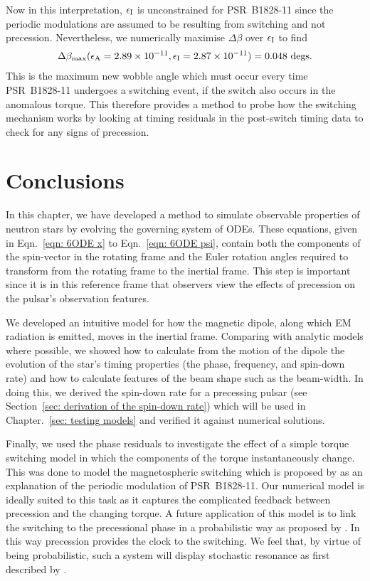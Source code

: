 \documentclass[../full_thesis/full_thesis.tex]{subfiles}
\begin{document}
Now in this interpretation, $\epsilon_{\mathrm{I}}$ is unconstrained for PSR~B1828-11 since the
periodic modulations are assumed to be resulting from switching and not
precession. Nevertheless, we numerically maximise $\Delta\beta$ over $\epsilon_{\mathrm{I}}$ to
find
\begin{align}
\Delta\beta_{\textrm{max}}(\epsilon_{\mathrm{A}}=2.89\times10^{-11}, \epsilon_{\mathrm{I}}=2.87\times10^{-11})
= 0.048 \textrm{ degs}.
\end{align}
This is the maximum new wobble angle which must occur every time PSR~B1828-11 undergoes a
switching event, if the switch also occurs in the anomalous torque. This
therefore provides a method to probe how the switching mechanism works by
looking at timing residuals in the post-switch timing data to check for
any signs of precession.

\section{Conclusions}
\label{sec: conclusion inertial}

In this chapter, we have developed a method to simulate observable properties
of neutron stars by evolving the governing system of ODEs. These equations,
given in Eqn.~\eqref{eqn: 6ODE x} to Eqn.~\eqref{eqn: 6ODE psi}, contain both
the components of the spin-vector in the rotating frame and the Euler rotation
angles required to transform from the rotating frame to the inertial frame.
This step is important since it is in this reference frame that observers view
the effects of precession on the pulsar's observation features.

We developed an intuitive model for how the magnetic dipole, along which EM
radiation is emitted, moves in the inertial frame. Comparing with analytic
models where possible, we showed how to calculate from the motion of the
dipole the evolution of the star's timing properties (the phase, frequency, and
spin-down rate) and how to calculate features of the beam shape such as the
beam-width. In doing this, we derived the spin-down rate for a precessing pulsar
(see Section~\ref{sec: derivation of the spin-down rate}) which will be used in
Chapter.~\ref{sec: testing models} and verified it against numerical solutions.

Finally, we used the phase residuals to investigate the effect of a simple torque
switching model in which the components of the torque instantaneously change.
This was done to model the magnetospheric switching which is
proposed by \citet{Lyne2010} as an explanation of the periodic modulation of
PSR~B1828-11. Our numerical model is ideally suited to this task as it captures the
complicated feedback between precession and the changing torque.
A future application of this model is to link the switching to the precessional
phase in a probabilistic way as proposed by \citet{Jones2012}. In this way
precession provides the clock to the switching. We feel that, by virtue of
being probabilistic, such a system will display stochastic resonance as first
described by \citet{Cordes2013}.

\biblio
\end{document}
